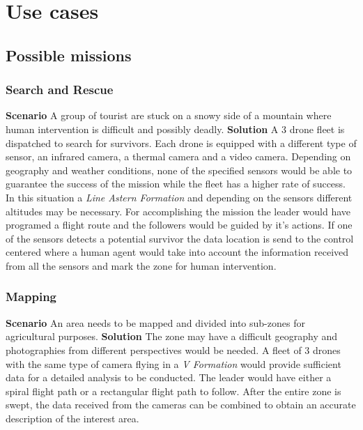 \chapter{Use cases}
\label{chapter:use cases}
\section{Possible missions}
\subsection{Search and Rescue}

\textbf{Scenario} \newline
A group of tourist are stuck on a snowy side of a mountain where human intervention
is difficult and possibly deadly.
\textbf{Solution} \newline
A 3 drone fleet is dispatched to search for survivors. Each drone is equipped with a different
type of sensor, an infrared camera, a thermal camera and a video camera. Depending
on geography and weather conditions, none of the specified sensors would be able
to guarantee the success of the mission while the fleet has a higher rate of success.
In this situation a \textit{Line Astern Formation} and depending on the sensors
different altitudes may be necessary. For accomplishing the mission the leader
would have programed a flight route and the followers would be guided by it's
actions. If one of the sensors detects a potential survivor the data location
is send to the control centered where a human agent would take into account
the information received from all the sensors and mark the zone for human 
intervention.

\subsection{Mapping}
\textbf{Scenario} \newline
An area needs to be mapped and divided into sub-zones for agricultural purposes.
\textbf{Solution} \newline
The zone may have a difficult geography and photographies from different
perspectives would be needed. A fleet of 3 drones with the same type of camera
flying in a \textit{V Formation} would provide sufficient data for a detailed 
analysis to be conducted. The leader would have either a spiral flight path 
or a rectangular flight path to follow. After the entire zone is swept, the data
received from the cameras can be combined to obtain an accurate description
of the interest area.

